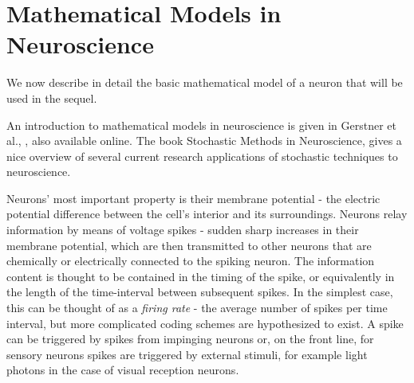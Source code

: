 \section{Mathematical Models in Neuroscience}
\label{sec:math_models_in_neuroscience}
We now describe in detail the basic mathematical model of a neuron that will be
used in the sequel. 

An introduction to mathematical models in neuroscience is given in Gerstner et
al., \cite{Gerstner2014}, also available online. The book Stochastic Methods in
Neuroscience, \cite{Laing2009} gives a nice overview of several current research
applications of stochastic techniques to neuroscience.

Neurons' most important property is their membrane potential - the electric
potential difference between the cell's interior and its surroundings. Neurons
relay information by means of voltage spikes - sudden sharp increases in their
membrane potential, which are then transmitted to other neurons that are
chemically or electrically connected to the spiking neuron. The information
content is thought to be contained in the timing of the spike, or equivalently
in the length of the time-interval between subsequent spikes. In the simplest
case, this can be thought of as a {\sl firing rate} - the average number of
spikes per time interval, but more complicated coding schemes are hypothesized
to exist. A spike can be triggered by spikes from impinging neurons or, on the
front line, for sensory neurons spikes are triggered by external stimuli, for
example light photons in the case of visual reception neurons. 

